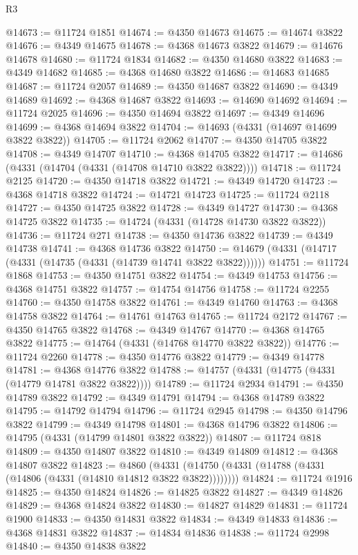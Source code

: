 \begin{lexlean}{R3}
\begin{coremodule}
@14673 := @11724 @1851
@14674 := @4350 @14673
@14675 := @14674 @3822
@14676 := @4349 @14675
@14678 := @4368 @14673 @3822
@14679 := @14676 @14678
@14680 := @11724 @1834
@14682 := @4350 @14680 @3822
@14683 := @4349 @14682
@14685 := @4368 @14680 @3822
@14686 := @14683 @14685
@14687 := @11724 @2057
@14689 := @4350 @14687 @3822
@14690 := @4349 @14689
@14692 := @4368 @14687 @3822
@14693 := @14690 @14692
@14694 := @11724 @2025
@14696 := @4350 @14694 @3822
@14697 := @4349 @14696
@14699 := @4368 @14694 @3822
@14704 := @14693 (@4331 (@14697 @14699 @3822 @3822))
@14705 := @11724 @2062
@14707 := @4350 @14705 @3822
@14708 := @4349 @14707
@14710 := @4368 @14705 @3822
@14717 := @14686 (@4331 (@14704 (@4331 (@14708 @14710 @3822 @3822))))
@14718 := @11724 @2125
@14720 := @4350 @14718 @3822
@14721 := @4349 @14720
@14723 := @4368 @14718 @3822
@14724 := @14721 @14723
@14725 := @11724 @2118
@14727 := @4350 @14725 @3822
@14728 := @4349 @14727
@14730 := @4368 @14725 @3822
@14735 := @14724 (@4331 (@14728 @14730 @3822 @3822))
@14736 := @11724 @271
@14738 := @4350 @14736 @3822
@14739 := @4349 @14738
@14741 := @4368 @14736 @3822
@14750 := @14679 (@4331 (@14717 (@4331 (@14735 (@4331 (@14739 @14741 @3822 @3822))))))
@14751 := @11724 @1868
@14753 := @4350 @14751 @3822
@14754 := @4349 @14753
@14756 := @4368 @14751 @3822
@14757 := @14754 @14756
@14758 := @11724 @2255
@14760 := @4350 @14758 @3822
@14761 := @4349 @14760
@14763 := @4368 @14758 @3822
@14764 := @14761 @14763
@14765 := @11724 @2172
@14767 := @4350 @14765 @3822
@14768 := @4349 @14767
@14770 := @4368 @14765 @3822
@14775 := @14764 (@4331 (@14768 @14770 @3822 @3822))
@14776 := @11724 @2260
@14778 := @4350 @14776 @3822
@14779 := @4349 @14778
@14781 := @4368 @14776 @3822
@14788 := @14757 (@4331 (@14775 (@4331 (@14779 @14781 @3822 @3822))))
@14789 := @11724 @2934
@14791 := @4350 @14789 @3822
@14792 := @4349 @14791
@14794 := @4368 @14789 @3822
@14795 := @14792 @14794
@14796 := @11724 @2945
@14798 := @4350 @14796 @3822
@14799 := @4349 @14798
@14801 := @4368 @14796 @3822
@14806 := @14795 (@4331 (@14799 @14801 @3822 @3822))
@14807 := @11724 @818
@14809 := @4350 @14807 @3822
@14810 := @4349 @14809
@14812 := @4368 @14807 @3822
@14823 := @4860
    (@4331 (@14750 (@4331 (@14788 (@4331 (@14806 (@4331 (@14810 @14812 @3822 @3822))))))))
@14824 := @11724 @1916
@14825 := @4350 @14824
@14826 := @14825 @3822
@14827 := @4349 @14826
@14829 := @4368 @14824 @3822
@14830 := @14827 @14829
@14831 := @11724 @1900
@14833 := @4350 @14831 @3822
@14834 := @4349 @14833
@14836 := @4368 @14831 @3822
@14837 := @14834 @14836
@14838 := @11724 @2998
@14840 := @4350 @14838 @3822

\end{coremodule}
\end{lexlean}
